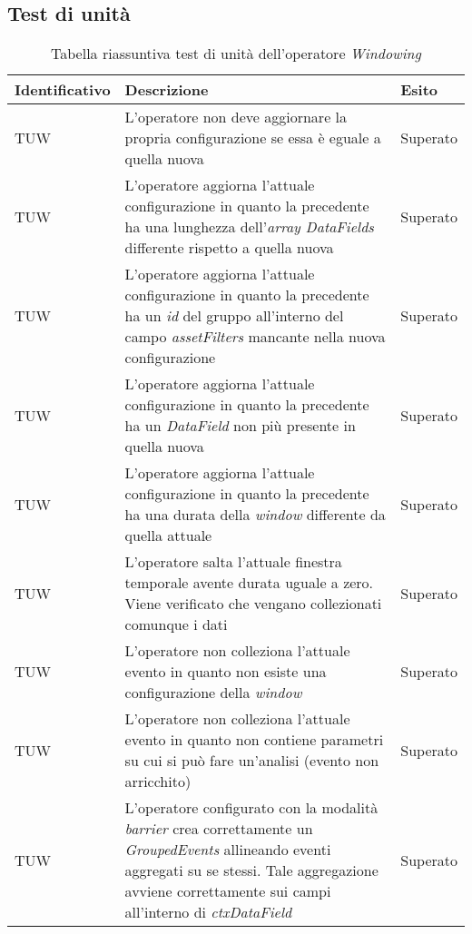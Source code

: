 \subsection{Test di unità}
{
\centering
\begin{longtable}{L{3cm} L{8.5cm} L{2cm}}
\caption{Tabella riassuntiva test di unità dell'operatore \textit{Windowing}}\\
\textbf{Identificativo} &
\textbf{Descrizione}&
\textbf{Esito}\\
\endhead
\hline

TUW & L'operatore non deve aggiornare la propria configurazione se essa è eguale a quella nuova & Superato \\
\hline
TUW & L'operatore aggiorna l'attuale configurazione in quanto la precedente ha una lunghezza dell'\textit{array DataFields} differente rispetto a quella nuova & Superato \\
\hline
TUW & L'operatore aggiorna l'attuale configurazione in quanto la precedente ha un \textit{id} del gruppo all'interno del campo \textit{assetFilters} mancante nella nuova configurazione & Superato\\
\hline
TUW & L'operatore aggiorna l'attuale configurazione in quanto la precedente ha un \textit{DataField} non più presente in quella nuova & Superato \\
\hline
TUW & L'operatore aggiorna l'attuale configurazione in quanto la precedente ha una durata della \textit{window} differente da quella attuale & Superato\\
\hline
TUW & L'operatore salta l'attuale finestra temporale avente durata uguale a zero. Viene verificato che vengano collezionati comunque i dati & Superato \\
\hline
TUW & L'operatore non colleziona l'attuale evento in quanto non esiste una configurazione della \textit{window} & Superato \\
\hline
TUW & L'operatore non colleziona l'attuale evento in quanto non contiene parametri su cui si può fare un'analisi (evento non arricchito) & Superato \\
\hline
TUW & L'operatore configurato con la modalità \textit{barrier} crea correttamente un \textit{GroupedEvents} allineando eventi aggregati su se stessi. Tale aggregazione avviene correttamente sui campi all'interno di \textit{ctxDataField} & Superato \\
\hline

\end{longtable}}
